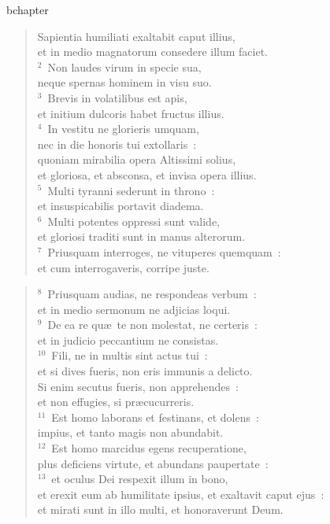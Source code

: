 bchapter\begin{verse}\vspace{-19pt}Sapientia humiliati exaltabit caput illius,\\ et in medio magnatorum consedere illum faciet.\\
${}^{2}$~Non laudes virum in specie sua,\\ neque spernas hominem in visu suo.\\
${}^{3}$~Brevis in volatilibus est apis,\\ et initium dulcoris habet fructus illius.\\
${}^{4}$~In vestitu ne glorieris umquam,\\ nec in die honoris tui extollaris~:\\ quoniam mirabilia opera Altissimi solius,\\ et gloriosa, et absconsa, et invisa opera illius.\\
${}^{5}$~Multi tyranni sederunt in throno~:\\ et insuspicabilis portavit diadema.\\
${}^{6}$~Multi potentes oppressi sunt valide,\\ et gloriosi traditi sunt in manus alterorum.\\
${}^{7}$~Priusquam interroges, ne vituperes quemquam~:\\ et cum interrogaveris, corripe juste.\end{verse}


\begin{verse}${}^{8}$~Priusquam audias, ne respondeas verbum~:\\ et in medio sermonum ne adjicias loqui.\\
${}^{9}$~De ea re qu\ae\ te non molestat, ne certeris~:\\ et in judicio peccantium ne consistas.\\
${}^{10}$~Fili, ne in multis sint actus tui~:\\ et si dives fueris, non eris immunis a delicto.\\ Si enim secutus fueris, non apprehendes~:\\ et non effugies, si pr\ae cucurreris.\\
${}^{11}$~Est homo laborans et festinans, et dolens~:\\ impius, et tanto magis non abundabit.\\
${}^{12}$~Est homo marcidus egens recuperatione,\\ plus deficiens virtute, et abundans paupertate~:\\
${}^{13}$~et oculus Dei respexit illum in bono,\\ et erexit eum ab humilitate ipsius, et exaltavit caput ejus~:\\ et mirati sunt in illo multi, et honoraverunt Deum.\end{verse}


